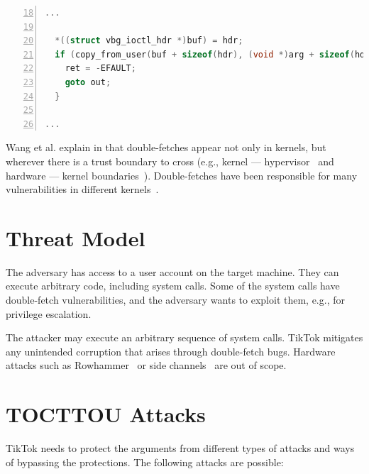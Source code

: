 \documentclass[conference]{IEEEtran}
\newcommand{\sysname}{TikTok}
\begin{document}
\begin{lstlisting}[language=C, caption=CVE-2018-12633 Double Fetch Fix,
  label=code:cvedoublefetchfix,  breaklines=true
  postbreak=\mbox{\textcolor{red}{$\hookrightarrow$}\space},
  numbers=left,basicstyle=\scriptsize, firstnumber=18, xleftmargin=5.0ex]
...

  *((struct vbg_ioctl_hdr *)buf) = hdr;
  if (copy_from_user(buf + sizeof(hdr), (void *)arg + sizeof(hdr), hdr.size_in - sizeof(hdr))) {
    ret = -EFAULT;
    goto out;
  }

...

\end{lstlisting}

Wang et al. explain in \cite{wang2018survey} that double-fetches appear not only
in kernels, but wherever there is a trust boundary to cross (e.g., kernel ---
hypervisor~\cite{wilhelm2016xenpwn} and hardware --- kernel
boundaries~\cite{lu2018untrusted}). Double-fetches have been responsible for many
vulnerabilities in different kernels~\cite{jurczyk2013bochspwn, wang2018survey}.


\section{Threat Model}
\label{sec:threatmodel}
The adversary has access to a user account on the target machine. They can
execute arbitrary code, including system calls. Some of the system calls
have double-fetch vulnerabilities, and the adversary wants to exploit them,
e.g., for privilege escalation.

The attacker may execute an arbitrary sequence of system calls. \sysname
mitigates any unintended corruption that arises through double-fetch bugs.
Hardware attacks such as Rowhammer~\cite{TODO} or side channels~\cite{TODO} are
out of scope.

\section{TOCTTOU Attacks}

\sysname{} needs to protect the arguments from different types of attacks and ways of
bypassing the protections. The following attacks are possible:
\end{document}
